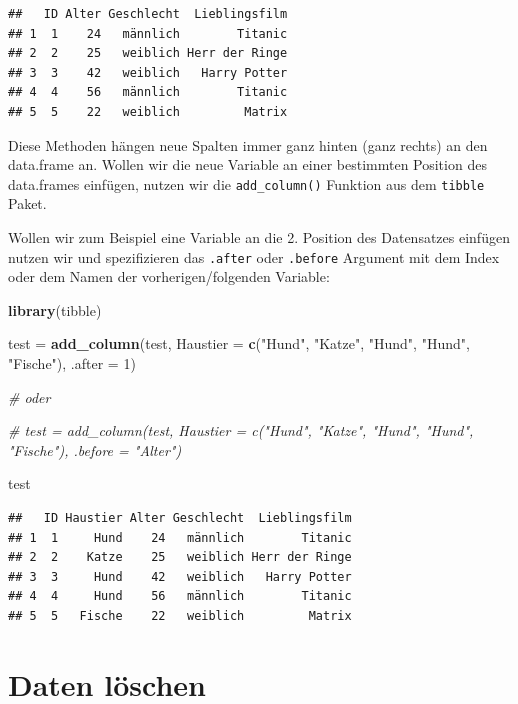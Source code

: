 \documentclass[
]{book}
\newenvironment{Shaded}{\begin{snugshade}}{\end{snugshade}}
\newcommand{\AttributeTok}[1]{\textcolor[rgb]{0.13,0.29,0.53}{#1}}
\newcommand{\CommentTok}[1]{\textcolor[rgb]{0.56,0.35,0.01}{\textit{#1}}}
\newcommand{\DecValTok}[1]{\textcolor[rgb]{0.00,0.00,0.81}{#1}}
\newcommand{\FunctionTok}[1]{\textcolor[rgb]{0.13,0.29,0.53}{\textbf{#1}}}
\newcommand{\NormalTok}[1]{#1}
\newcommand{\OtherTok}[1]{\textcolor[rgb]{0.56,0.35,0.01}{#1}}
\newcommand{\StringTok}[1]{\textcolor[rgb]{0.31,0.60,0.02}{#1}}
\begin{document}
\begin{verbatim}
##   ID Alter Geschlecht  Lieblingsfilm
## 1  1    24   männlich        Titanic
## 2  2    25   weiblich Herr der Ringe
## 3  3    42   weiblich   Harry Potter
## 4  4    56   männlich        Titanic
## 5  5    22   weiblich         Matrix
\end{verbatim}

Diese Methoden hängen neue Spalten immer ganz hinten (ganz rechts) an den data.frame an.
Wollen wir die neue Variable an einer bestimmten Position des data.frames einfügen, nutzen wir die \texttt{add\_column()} Funktion aus dem \texttt{tibble} Paket.

Wollen wir zum Beispiel eine Variable an die 2. Position des Datensatzes einfügen nutzen wir und spezifizieren das \texttt{.after} oder \texttt{.before} Argument mit dem Index oder dem Namen der vorherigen/folgenden Variable:

\begin{Shaded}
\begin{Highlighting}[]
\FunctionTok{library}\NormalTok{(tibble)}

\NormalTok{test }\OtherTok{=} \FunctionTok{add\_column}\NormalTok{(test, }\AttributeTok{Haustier =} \FunctionTok{c}\NormalTok{(}\StringTok{"Hund"}\NormalTok{, }\StringTok{"Katze"}\NormalTok{, }\StringTok{"Hund"}\NormalTok{, }\StringTok{"Hund"}\NormalTok{, }\StringTok{"Fische"}\NormalTok{),  }\AttributeTok{.after =} \DecValTok{1}\NormalTok{)}

\CommentTok{\# oder }

\CommentTok{\# test = add\_column(test, Haustier = c("Hund", "Katze", "Hund", "Hund", "Fische"),  .before = "Alter")}

\NormalTok{test}
\end{Highlighting}
\end{Shaded}

\begin{verbatim}
##   ID Haustier Alter Geschlecht  Lieblingsfilm
## 1  1     Hund    24   männlich        Titanic
## 2  2    Katze    25   weiblich Herr der Ringe
## 3  3     Hund    42   weiblich   Harry Potter
## 4  4     Hund    56   männlich        Titanic
## 5  5   Fische    22   weiblich         Matrix
\end{verbatim}

\section{Daten löschen}\label{daten-luxf6schen}
\end{document}

